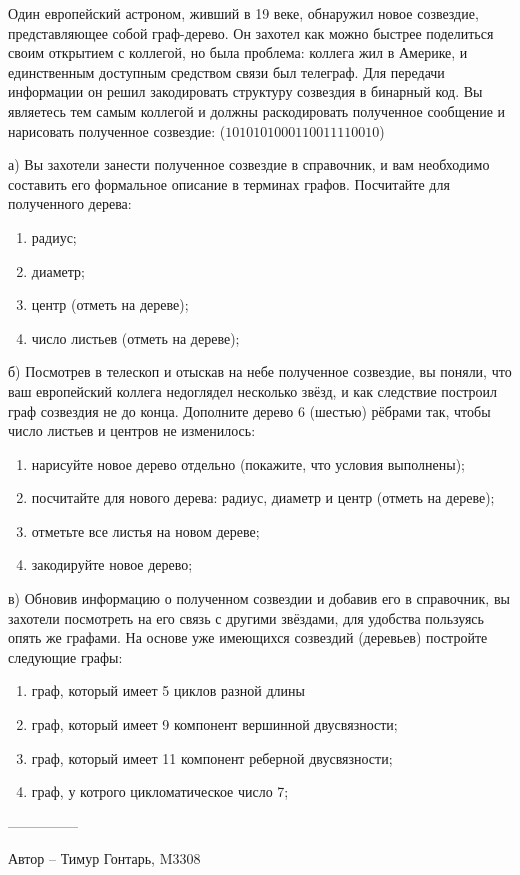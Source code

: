 \question
Один европейский астроном, живший в 19 веке, обнаружил новое созвездие, представляющее собой граф-дерево. Он захотел как можно быстрее поделиться своим открытием с коллегой, но была проблема: коллега жил в Америке, и единственным доступным средством связи был телеграф. Для передачи информации он решил закодировать структуру созвездия в бинарный код. Вы являетесь тем самым коллегой и должны раскодировать полученное сообщение и нарисовать полученное созвездие: ($1010101000110011110010$)

а) Вы захотели занести полученное созвездие в справочник, и вам необходимо составить его формальное описание в терминах графов. Посчитайте для полученного дерева:
\begin{enumerate}
\item радиус;
\item диаметр;
\item центр (отметь на дереве);
\item число листьев (отметь на дереве);
\end{enumerate}

б) Посмотрев в телескоп и отыскав на небе полученное созвездие, вы поняли, что ваш европейский коллега недоглядел несколько звёзд, и как следствие построил граф созвездия не до конца. Дополните дерево 6 (шестью) рёбрами так, чтобы число листьев и центров не изменилось:
\begin{enumerate}
\item нарисуйте новое дерево отдельно (покажите, что условия выполнены);
\item посчитайте для нового дерева: радиус, диаметр и центр (отметь на дереве);
\item отметьте все листья на новом дереве;
\item закодируйте новое дерево;
\end{enumerate}

в) Обновив информацию о полученном созвездии и добавив его в справочник, вы захотели посмотреть на его связь с другими звёздами, для удобства пользуясь опять же графами. На основе уже имеющихся созвездий (деревьев) постройте следующие графы:
\begin{enumerate}
\item граф, который имеет 5 циклов разной длины
\item граф, который имеет 9 компонент вершинной двусвязности;
\item граф, который имеет 11 компонент реберной двусвязности;
\item граф, у котрого цикломатическое число 7;
\end{enumerate}

---------------

Автор -- Тимур Гонтарь, M3308
